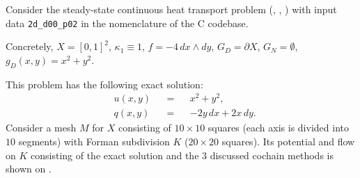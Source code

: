 \begin{example}
  Consider the steady-state continuous heat transport problem
  (,
   ,
   )
  with input data \verb|2d_d00_p02| in the nomenclature of the C codebase.

  Concretely, $X = [0, 1]^2$, $\kappa_1 \equiv 1$, $f = -4 \, d x \wedge d y$,
  $G_D = \partial X$, $G_N = \emptyset$, $g_D(x, y) = x^2 + y^2$.

  This problem has the following exact solution:
  \begin{subequations}
    \begin{alignat}{3}
      & u(x, y) && = && x^2 + y^2, \\
      & q(x, y) && = && - 2 y\, d x + 2 x\, d y.
    \end{alignat}
  \end{subequations}
  Consider a mesh $M$ for $X$ consisting of $10 \times 10$ squares (each axis is
  divided into $10$ segments) with Forman subdivision $K$ ($20 \times 20$
  squares).
  Its potential and flow on $K$ consisting of the exact solution and the $3$
  discussed cochain methods is shown on
  .
\end{example}
